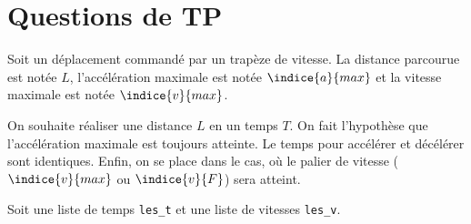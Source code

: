 \documentclass[10pt,fleqn]{article} %
\newcommand{\repRel}{../../../}
\newcommand{\repStyle}{\repRel/Style}
\def\numds{DS 3}
\def\xxactivite{\textsf{\numds}}
\begin{document}

\vspace{5.5cm}
\pagestyle{fancy}
\thispagestyle{plain}

\def\columnseprulecolor{\color{ocre}}
\setlength{\columnseprule}{0.4pt} 



\def\xxactivite{}
\def\xxnumactivite{}
\def\xxdate{3 novembre 2025}


\normaltrue
\newpage
\proffalse \colletrue



\vspace{5cm}

\proftrue
\proffalse


\graphicspath{{\repStyle/png/}{../../../Sujets_Concours/2005/EA_Plateau/images/}{../../../Sujets_Concours/2015/CCMP_PSI_Lola/images/}}


\section*{Questions de TP}

Soit un déplacement commandé par un trapèze de vitesse. La distance parcourue est notée $L$, l'accélération maximale est notée $\indice{a}{max}$ et la vitesse maximale est notée $\indice{v}{max}$.


On souhaite réaliser une distance $L$ en un temps $T$. On fait l'hypothèse que l'accélération maximale est toujours atteinte. Le temps pour accélérer et décélérer sont identiques. Enfin, on se place dans le cas, où le palier de vitesse ($\indice{v}{max}$ ou $\indice{v}{F}$) sera atteint.


Soit une liste de temps \lstinline{les_t} et une liste de vitesses \lstinline{les_v}. 





\end{document}
